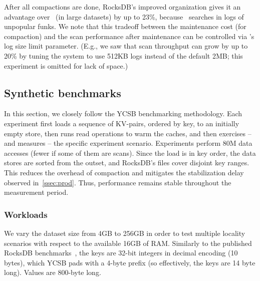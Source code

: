 After all compactions are done, RocksDB's improved organization gives it an advantage  over \sys\
(in large datasets) by up to 23\%, because \sys\ searches
in  logs of unpopular funks. We note that this tradeoff between the maintenance cost (for compaction) 
and the scan performance after maintenance  can be controlled via \sys's log size limit parameter.
(E.g., we saw that scan throughput can  grow by up to 20\%  by tuning the system to use 512KB logs instead of
the default 2MB; this experiment is omitted for lack of space.)





\subsection{Synthetic benchmarks}
\label{ssec:synthetic} 


In this section, we closely follow the YCSB benchmarking methodology. 
Each experiment first  loads a sequence of KV-pairs, ordered by key, to an initially empty store, then  
runs read operations to warm the caches, and then exercises -- and measures --  the specific experiment 
scenario. Experiments perform 80M data accesses (fewer if some of them are scans). 
Since the load is in key order, the data stores are sorted from the outset, and RocksDB's files cover disjoint key ranges. 
This reduces the overhead of compaction and mitigates the stabilization delay observed in~\cref{ssec:prod}.  Thus, 
performance remains stable throughout the measurement period.

\subsubsection{Workloads}

We vary the dataset size from 4GB to 256GB in order to test multiple locality 
scenarios with respect to the available 16GB of RAM. Similarly to the published RocksDB benchmarks~\cite{RocksDBPerf}, 
the keys are 32-bit integers in decimal encoding (10 bytes), which YCSB pads with a 4-byte prefix (so effectively, 
the keys are 14 byte long). Values are 800-byte long. 


